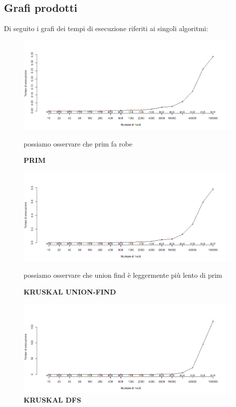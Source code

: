 \documentclass[]{article}
\begin{document}
\subsection{Grafi prodotti}
\begin{flushleft}

Di seguito i grafi dei tempi di esecuzione riferiti ai singoli algoritmi:

\begin{figure}[h]
\includegraphics[width=\textwidth,height=\textheight,keepaspectratio]{PRIM_MEDIA.png}
\caption{\textbf{PRIM}}

possiamo osservare che prim fa robe
\end{figure}

\begin{figure}[h]
\includegraphics[width=\textwidth,height=\textheight,keepaspectratio]{K_UNION_MEDIA.png}
\caption{\textbf{KRUSKAL UNION-FIND}}

possiamo osservare che union find è leggermente più lento di prim
\end{figure}

\begin{figure}[h]

\includegraphics[width=\textwidth,height=\textheight,keepaspectratio]{K_DFS_MEDIA.png}
\caption{\textbf{KRUSKAL DFS}}


\end{figure}
\end{flushleft}
\end{document}
